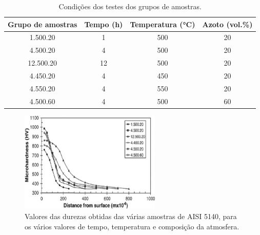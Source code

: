 \begin{table}[htb]
    \centering
    \caption[Condições dos testes das amostras com vários parâmetros de nitruração]%
    {Condições dos testes dos grupos de amostras\cite{Karaoglu2002}.}
    \label{tab:Nitriding_cond}
    \begin{tabular}{cccc} 
    \toprule
    \textbf{Grupo de amostras} & \textbf{Tempo (h)} & \textbf{Temperatura (°C)} & \textbf{Azoto (vol.\%)}  \\ 
    \hline\hline
    1.500.20                   & 1                  & 500                       & 20                       \\
    4.500.20                   & 4                  & 500                       & 20                       \\
    12.500.20                  & 12                 & 500                       & 20                       \\
    4.450.20                   & 4                  & 450                       & 20                       \\
    4.550.20                   & 4                  & 550                       & 20                       \\
    4.500.60                   & 4                  & 500                       & 60                       \\
    \bottomrule
    \end{tabular}
\end{table}
\begin{figure}[htb]
    \centering
    \includegraphics[width = 0.6\textwidth]{Figures/Cap2/Nitriding_gradients.jpg}
    \caption[Durezas obtidas após nitruração]%
    {Valores das durezas obtidas das várias amostras de AISI 5140, para os vários valores de tempo, temperatura e composição da atmosfera\cite{Karaoglu2002}.}
    \label{fig:Nitriding_gradients}
\end{figure}
